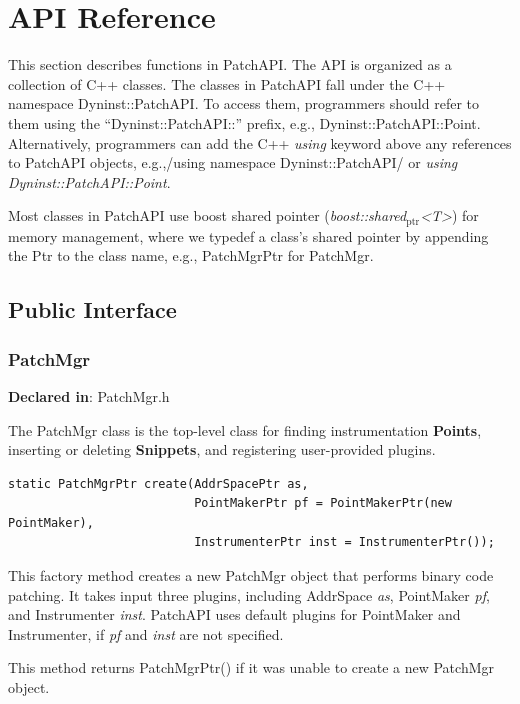 \documentclass[11pt]{article}
\begin{document}
\section{API Reference}
\label{sec-3}

This section describes functions in PatchAPI. The API is organized as a
collection of C++ classes. The classes in PatchAPI fall under the C++ namespace
Dyninst::PatchAPI. To access them, programmers should refer to them using the
``Dyninst::PatchAPI::'' prefix, e.g., Dyninst::PatchAPI::Point. Alternatively,
programmers can add the C++ \emph{using} keyword above any references to PatchAPI
objects, e.g.,/using namespace Dyninst::PatchAPI/ or \emph{using Dyninst::PatchAPI::Point}.

Most classes in PatchAPI use boost shared pointer (\emph{boost::shared$_{\mathrm{ptr}}$<T>}) for
memory management, where we typedef a class's shared pointer by appending the
Ptr to the class name, e.g., PatchMgrPtr for PatchMgr.

\subsection{Public Interface}
\label{sec-3.1}

\subsubsection{PatchMgr}
\label{sec-3.1.1}

\textbf{Declared in}: PatchMgr.h

The PatchMgr class is the top-level class for finding instrumentation \textbf{Points},
inserting or deleting \textbf{Snippets}, and registering user-provided plugins.


\begin{verbatim}
static PatchMgrPtr create(AddrSpacePtr as,
                          PointMakerPtr pf = PointMakerPtr(new PointMaker),
                          InstrumenterPtr inst = InstrumenterPtr());

\end{verbatim}



This factory method creates a new PatchMgr object that performs binary code
patching. It takes input three plugins, including AddrSpace \emph{as}, PointMaker
\emph{pf}, and Instrumenter \emph{inst}. PatchAPI uses default plugins for PointMaker and
Instrumenter, if \emph{pf} and \emph{inst} are not specified.

This method returns PatchMgrPtr() if it was unable to create a new PatchMgr
object.
\end{document}

